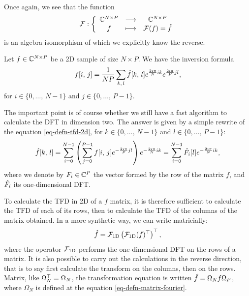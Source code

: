  Once again, we see that the function
\begin{equation*}
\mathcal{F}: {\left\{ \begin{array}{ccc} \mathbb{C}^{N \times P} & \longrightarrow & \mathbb{C}^{N \times P} \\ f & \longmapsto & \mathcal{F}(f) = \hat{f} \end{array} \right.}
\end{equation*}
is an algebra isomorphism of which we explicitly know the reverse.
 
\begin{prop}
Let $ f \in \mathbb{C}^{N \times P} $ be a 2D sample of size $ N \times P $. We have the inversion formula
\begin{equation*}
f[i, \, j] = \frac{1}{NP} \sum_{k, \, l}{\hat{f}[k, \, l] e^{\frac{2 \imath \pi }{N} ik} e^{\frac{2 \imath \pi}{P} jl}},
\end{equation*}
for $ i \in \{0, \ldots, \, N-1\} $ and $ j \in \{0, \ldots, \, P-1\} $.
\end{prop}
 
 
 
The important point is of course whether we still have a fast algorithm to calculate the DFT in dimension two. The answer is given by a simple rewrite of the equation \eqref{eq-defn-tfd-2d}, for $ k \in \{0, \ldots, \, N-1\} $ and $ l \in \{0, \ldots, \, P-1\} $:
\begin{equation*}
\hat{f}[k, \, l] = \sum_{i = 0}^{N-1}{\left(\sum_{j = 0}^{P-1}{f[i, \, j] e^{- \frac{2 \imath \pi}{P} jl}} \right) e^{- \frac{2 \imath \pi}{N} ik}} = \sum_{i = 0 }^{N-1}{\hat{F_i}[l] e^{- \frac{2 \imath \pi}{N} ik}},
\end{equation*}
where we denote by $ F_i \in \mathbb{C}^P $ the vector formed by the  row of the matrix $ f $, and $ \hat{F_i} $ its one-dimensional DFT.
 
 
To calculate the TFD in 2D of a $ f $ matrix, it is therefore sufficient to calculate the TFD of each of its rows, then to calculate the TFD of the columns of the matrix obtained. In a more synthetic way, we can write matricially:
\begin{equation*}
\hat{f} = \mathcal{F}_{\text{1D}} \left(\mathcal{F}_{\text{1D}} (f)^\top \right)^\top,
\end{equation*}
where the operator $ \mathcal{F}_{\text{1D}} $ performs the one-dimensional DFT on the rows of a matrix. It is also possible to carry out the calculations in the reverse direction, that is to say first calculate the transform on the columns, then on the rows. Matrix, like $ \Omega_N^\top = \Omega_N $, the transformation equation is written $ \hat{f} = \Omega_N f \Omega_P $, where $ \Omega_N $ is defined at the equation \eqref{eq-defn-matrix-fourier}.
 

